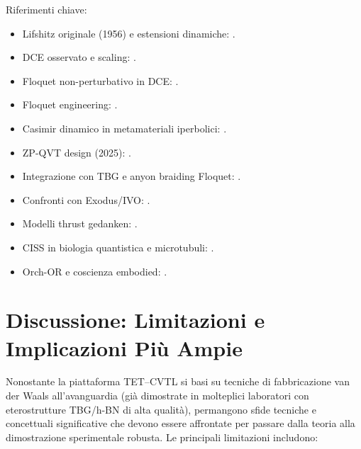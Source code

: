 \documentclass[11pt,a4paper]{article}
\let\oldcite\cite
\renewcommand{\cite}{\protect\oldcite}
\theoremstyle{plain}
\theoremstyle{definition}
\begin{document}
Riferimenti chiave:
\begin{itemize}
\item Lifshitz originale (1956) e estensioni dinamiche: \cite{Lifshitz1956}.
\item DCE osservato e scaling: \cite{Wilson2011, Lahteenmaki2013}.
\item Floquet non-perturbativo in DCE: \cite{Macrì2018, Tanaka2020}.
\item Floquet engineering: \cite{Oka2013, Eckardt2017}.
\item Casimir dinamico in metamateriali iperbolici: \cite{Guo2012, Intravaia2024}.
\item ZP-QVT design (2025): \cite{ZeinerGundersen2025}.
\item Integrazione con TBG e anyon braiding Floquet: \cite{PhysSoliman2026b}.
\item Confronti con Exodus/IVO: \cite{BuhlerAPEC2025, IVO2026}.
\item Modelli thrust gedanken: \cite{Maclay2007}.
\item CISS in biologia quantistica e microtubuli: \cite{Kumar2026, Rana2025}.
\item Orch-OR e coscienza embodied: \cite{HameroffPenrose2014, Beshkar2025}.
\end{itemize}







\section{Discussione: Limitazioni e Implicazioni Più Ampie}

Nonostante la piattaforma TET--CVTL si basi su tecniche di fabbricazione van der Waals all'avanguardia (già dimostrate in molteplici laboratori con eterostrutture TBG/h-BN di alta qualità), permangono sfide tecniche e concettuali significative che devono essere affrontate per passare dalla teoria alla dimostrazione sperimentale robusta. Le principali limitazioni includono:
\end{document}

